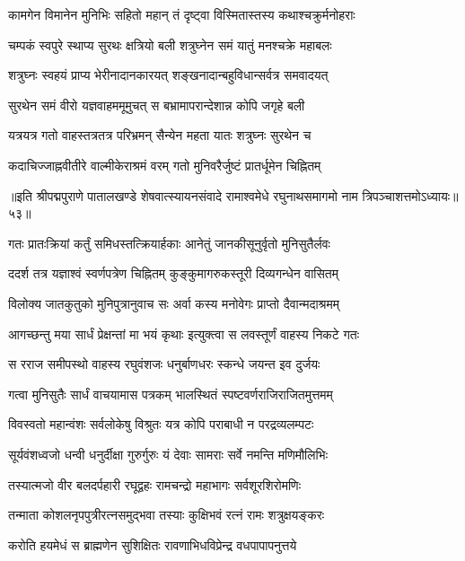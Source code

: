 \twolineshloka
{कामगेन विमानेन मुनिभिः सहितो महान्}
{तं दृष्ट्वा विस्मितास्तस्य कथाश्चक्रुर्मनोहराः}%

\twolineshloka
{चम्पकं स्वपुरे स्थाप्य सुरथः क्षत्रियो बली}
{शत्रुघ्नेन समं यातुं मनश्चक्रे महाबलः}%

\twolineshloka
{शत्रुघ्नः स्वहयं प्राप्य भेरीनादानकारयत्}
{शङ्खनादान्बहुविधान्सर्वत्र समवादयत्}%

\twolineshloka
{सुरथेन समं वीरो यज्ञवाहममूमुचत्}
{स बभ्रामापरान्देशान्न कोपि जगृहे बली}%

\twolineshloka
{यत्रयत्र गतो वाहस्तत्रतत्र परिभ्रमन्}
{सैन्येन महता यातः शत्रुघ्नः सुरथेन च}%

\twolineshloka
{कदाचिज्जाह्नवीतीरे वाल्मीकेराश्रमं वरम्}
{गतो मुनिवरैर्जुष्टं प्रातर्धूमेन चिह्नितम्}%

{॥इति श्रीपद्मपुराणे पातालखण्डे शेषवात्स्यायनसंवादे रामाश्वमेधे रघुनाथसमागमो नाम त्रिपञ्चाशत्तमोऽध्यायः॥५३॥}



\twolineshloka
{गतः प्रातःक्रियां कर्तुं समिधस्तत्क्रियार्हकाः}
{आनेतुं जानकीसूनुर्वृतो मुनिसुतैर्लवः}%

\twolineshloka
{ददर्श तत्र यज्ञाश्वं स्वर्णपत्रेण चिह्नितम्}
{कुङ्कुमागरुकस्तूरी दिव्यगन्धेन वासितम्}%

\twolineshloka
{विलोक्य जातकुतुको मुनिपुत्रानुवाच सः}
{अर्वा कस्य मनोवेगः प्राप्तो दैवान्मदाश्रमम्}%

\twolineshloka
{आगच्छन्तु मया सार्धं प्रेक्षन्तां मा भयं कृथाः}
{इत्युक्त्वा स लवस्तूर्णं वाहस्य निकटे गतः}%

\twolineshloka
{स रराज समीपस्थो वाहस्य रघुवंशजः}
{धनुर्बाणधरः स्कन्धे जयन्त इव दुर्जयः}%

\twolineshloka
{गत्वा मुनिसुतैः सार्धं वाचयामास पत्रकम्}
{भालस्थितं स्पष्टवर्णराजिराजितमुत्तमम्}%

\twolineshloka
{विवस्वतो महान्वंशः सर्वलोकेषु विश्रुतः}
{यत्र कोपि पराबाधी न परद्रव्यलम्पटः}%

\twolineshloka
{सूर्यवंशध्वजो धन्वी धनुर्दीक्षा गुरुर्गुरुः}
{यं देवाः सामराः सर्वे नमन्ति मणिमौलिभिः}%

\twolineshloka
{तस्यात्मजो वीर बलदर्पहारी रघूद्वहः}
{रामचन्द्रो महाभागः सर्वशूरशिरोमणिः}%

\twolineshloka
{तन्माता कोशलनृपपुत्रीरत्नसमुद्भवा}
{तस्याः कुक्षिभवं रत्नं रामः शत्रुक्षयङ्करः}%

\twolineshloka
{करोति हयमेधं स ब्राह्मणेन सुशिक्षितः}
{रावणाभिधविप्रेन्द्र वधपापापनुत्तये}%

